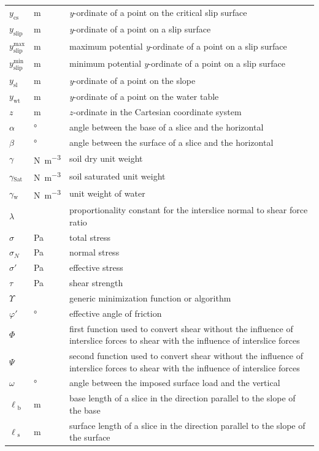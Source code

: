 \documentclass[12pt]{article}
\begin{document}
\begin{longtable*}{  l  l  p{8.5cm}  }
\\
$y_{\text{cs}}$ & \si{\meter} & \textit{y}-ordinate of a point on the critical 
slip 
surface
\\
${y_{\text{slip}}}$ & \si{\meter}& \textit{y}-ordinate of a point on a slip 
surface
\\
${y_{\text{slip}}^{\text{max}}}$ &  \si{\meter}& maximum potential 
\textit{y}-ordinate of a point on a slip surface
\\
${y_{\text{slip}}^{\text{min}}}$ &  \si{\meter}& minimum potential 
\textit{y}-ordinate of a point on a slip surface
\\
${y_{\text{sl}}}$ &  \si{\meter}& \textit{y}-ordinate of a point on the slope 
\\
${y_{\text{wt}}}$ &  \si{\meter}& \textit{y}-ordinate of a point on the water 
table
\\
$z$ & \si{\meter} & $z$-ordinate in the Cartesian coordinate system
\\
$\alpha{}$ & \si{\degree} & angle between the base of a slice and the horizontal
\\
$\beta{}$ &\si{\degree} & angle between the surface of a slice and the 
horizontal
\\
$\gamma{}$ & \si{\newton\per\cubic\meter} & soil dry unit weight
\\
${\gamma{}_{\text{Sat}}}$ &  \si{\newton\per\cubic\meter} & soil saturated unit 
weight
\\
${\gamma{}_{\text{w}}}$ & \si{\newton\per\cubic\meter} & unit weight of water
\\
$\lambda{}$ & & proportionality constant for the interslice normal to shear 
force ratio
\\
$\sigma{}$ & \si{\pascal} & total stress 
\\
$\sigma{}_N$ & \si{\pascal} & normal stress
\\
$\sigma{}'$ & \si{\pascal} & effective stress
\\
$\tau{}$ & \si{\pascal} & shear strength
\\
$\Upsilon{}$ & & generic minimization function or algorithm 
\\
$\varphi{}'$ & \si{\degree} & effective angle of friction
\\
$\Phi{}$ & & first function used to convert shear without the 
influence of interslice forces to shear with the influence of 
interslice forces
\\
$\Psi{}$ & & second function used to convert shear without the 
influence of interslice forces to shear with the influence of interslice 
forces
\\
$\omega{}$ & \si{\degree} & angle between the imposed surface load and the 
vertical
\\
${\ell{}_{\text{b}}}$ &  \si{\meter}& base length of a slice in the 
direction parallel to the slope of the base
\\
${\ell{}_{\text{s}}}$ &  \si{\meter}& surface length of a slice in the 
direction 
parallel to the slope of the surface \\

\hline
\end{longtable*}
\end{document}

